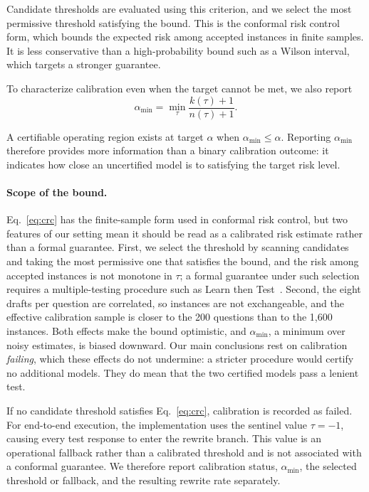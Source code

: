 \documentclass[sigconf, review, anonymous]{acmart}
\begin{document}
Candidate thresholds are evaluated using this criterion, and we
select the most permissive threshold satisfying the bound. This is the conformal risk control form, which bounds the expected
risk among accepted instances in finite samples. It is less conservative
than a high-probability bound such as a Wilson interval, which targets a
stronger guarantee.

To characterize calibration even when the target cannot be met, we
also report
\begin{equation}
    \alpha_{\min}
    =
    \min_{\tau}
    \frac{k(\tau)+1}{n(\tau)+1}.
    \label{eq:alpha_min}
\end{equation}

A certifiable operating region exists at target $\alpha$ when
$\alpha_{\min} \leq \alpha$. Reporting $\alpha_{\min}$ therefore
provides more information than a binary calibration outcome: it
indicates how close an uncertified model is to satisfying the target
risk level.

\paragraph{Scope of the bound.} Eq.~\ref{eq:crc} has the finite-sample form
used in conformal risk control, but two features of our setting mean it
should be read as a calibrated risk estimate rather than a formal
guarantee. First, we select the threshold by scanning candidates and
taking the most permissive one that satisfies the bound, and the risk
among accepted instances is not monotone in $\tau$; a formal guarantee
under such selection requires a multiple-testing procedure such as Learn
then Test~\cite{angelopoulos2025learn}. Second, the eight drafts per
question are correlated, so instances are not exchangeable, and the
effective calibration sample is closer to the 200 questions than to the
1{,}600 instances. Both effects make the bound optimistic, and
$\alpha_{\min}$, a minimum over noisy estimates, is biased downward. Our
main conclusions rest on calibration \emph{failing}, which these effects
do not undermine: a stricter procedure would certify no additional
models. They do mean that the two certified models pass a lenient test.

If no candidate threshold satisfies Eq.~\ref{eq:crc}, calibration is
recorded as failed. For end-to-end execution, the implementation uses
the sentinel value $\tau=-1$, causing every test response to enter
the rewrite branch. This value is an operational fallback rather than
a calibrated threshold and is not associated with a conformal
guarantee. We therefore report calibration status,
$\alpha_{\min}$, the selected threshold or fallback, and the
resulting rewrite rate separately.
\end{document}
